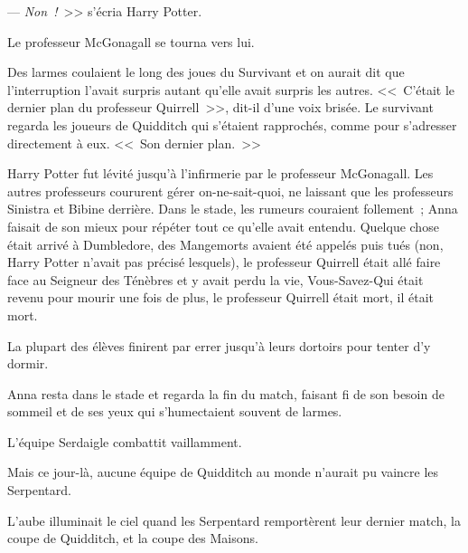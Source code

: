 --- \emph{Non~!}~>> s'écria Harry Potter.

Le professeur McGonagall se tourna vers lui.

Des larmes coulaient le long des joues du Survivant et on aurait dit que l'interruption l'avait surpris autant qu'elle avait surpris les autres. <<~C'était le dernier plan du professeur Quirrell~>>, dit-il d'une voix brisée. Le survivant regarda les joueurs de Quidditch qui s'étaient rapprochés, comme pour s'adresser directement à eux. <<~Son dernier plan.~>>

Harry Potter fut lévité jusqu'à l'infirmerie par le professeur McGonagall. Les autres professeurs coururent gérer on-ne-sait-quoi, ne laissant que les professeurs Sinistra et Bibine derrière. Dans le stade, les rumeurs couraient follement~; Anna faisait de son mieux pour répéter tout ce qu'elle avait entendu. Quelque chose était arrivé à Dumbledore, des Mangemorts avaient été appelés puis tués (non, Harry Potter n'avait pas précisé lesquels), le professeur Quirrell était allé faire face au Seigneur des Ténèbres et y avait perdu la vie, Vous-Savez-Qui était revenu pour mourir une fois de plus, le professeur Quirrell était mort, il était mort.

La plupart des élèves finirent par errer jusqu'à leurs dortoirs pour tenter d'y dormir.

Anna resta dans le stade et regarda la fin du match, faisant fi de son besoin de sommeil et de ses yeux qui s'humectaient souvent de larmes.

L'équipe Serdaigle combattit vaillamment.

Mais ce jour-là, aucune équipe de Quidditch au monde n'aurait pu vaincre les Serpentard.

L'aube illuminait le ciel quand les Serpentard remportèrent leur dernier match, la coupe de Quidditch, et la coupe des Maisons.
